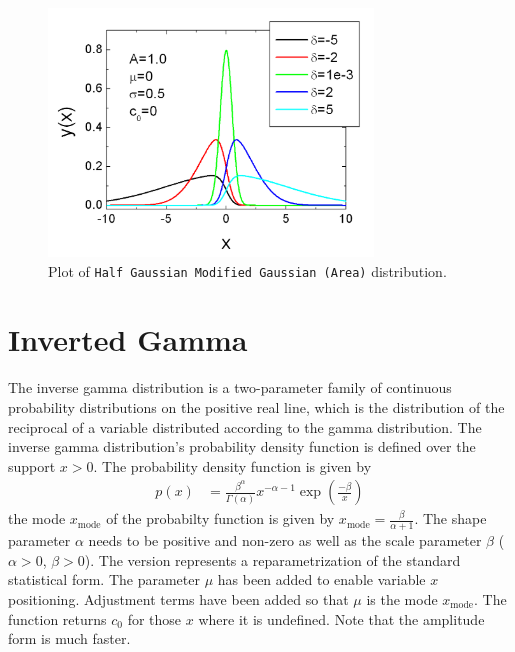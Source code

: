 \begin{figure}[htb]
\begin{center}
\includegraphics[width=0.768\textwidth]{halfGaussianModifiedGaussianArea.png}
\end{center}
\caption{Plot of \texttt{Half Gaussian Modified Gaussian (Area)} distribution.}
\label{fig:GMGArea}
\end{figure}


\clearpage
\section{Inverted Gamma}
\label{sec:InvertedGamma}

The inverse gamma distribution is a two-parameter family of
continuous probability distributions on the positive real line,
which is the distribution of the reciprocal of a variable
distributed according to the gamma distribution. The inverse gamma
distribution's probability density function is defined over the
support $x > 0$. The probability density function is given by
\begin{align}
p(x) &= \frac{\beta^\alpha}{\Gamma(\alpha)} x^{-\alpha - 1} \exp
\left(\frac{-\beta}{x}\right)
\end{align}
the mode $x_\text{mode}$ of the probabilty function is given by
$x_\text{mode} = \frac{\beta}{\alpha+1}$. The shape parameter
$\alpha$ needs to be positive and non-zero as well as the scale
parameter $\beta$ ($\alpha>0$, $\beta>0$).
The \SASfit version represents a reparametrization of the standard statistical
form. The parameter $\mu$ has been added to enable variable $x$ positioning.
Adjustment terms have been added so that $\mu$ is the mode $x_\text{mode}$.
The function returns $c_0$ for those $x$ where it is undefined.
Note that the amplitude form is much faster.

